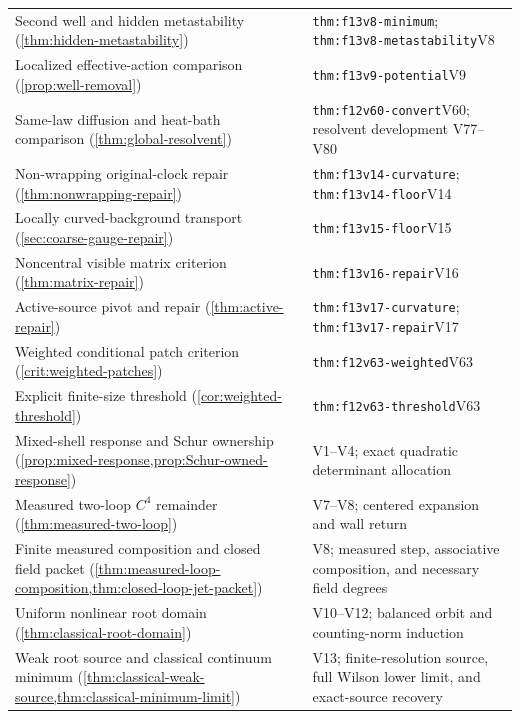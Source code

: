 \documentclass[11pt,oneside,openany]{book}
\theoremstyle{definition}
\theoremstyle{remark}
\begin{document}
\begin{longtable}{L{0.32\textwidth}L{0.12\textwidth}L{0.477\textwidth}}
Second well and hidden metastability (\cref{thm:hidden-metastability}) & \cite{F13} & \nolinkurl{thm:f13v8-minimum}; \nolinkurl{thm:f13v8-metastability}\newline V8 \\
Localized effective-action comparison (\cref{prop:well-removal}) & \cite{F13} & \nolinkurl{thm:f13v9-potential}\newline V9 \\
Same-law diffusion and heat-bath comparison (\cref{thm:global-resolvent}) & \cite{F12} & \nolinkurl{thm:f12v60-convert}\newline V60; resolvent development V77--V80 \\
Non-wrapping original-clock repair (\cref{thm:nonwrapping-repair}) & \cite{F13} & \nolinkurl{thm:f13v14-curvature}; \nolinkurl{thm:f13v14-floor}\newline V14 \\
Locally curved-background transport (\cref{sec:coarse-gauge-repair}) & \cite{F13} & \nolinkurl{thm:f13v15-floor}\newline V15 \\
Noncentral visible matrix criterion (\cref{thm:matrix-repair}) & \cite{F13} & \nolinkurl{thm:f13v16-repair}\newline V16 \\
Active-source pivot and repair (\cref{thm:active-repair}) & \cite{F13} & \nolinkurl{thm:f13v17-curvature}; \nolinkurl{thm:f13v17-repair}\newline V17 \\
Weighted conditional patch criterion (\cref{crit:weighted-patches}) & \cite{F12} & \nolinkurl{thm:f12v63-weighted}\newline V63 \\
Explicit finite-size threshold (\cref{cor:weighted-threshold}) & \cite{F12} & \nolinkurl{thm:f12v63-threshold}\newline V63 \\

Mixed-shell response and Schur ownership (\cref{prop:mixed-response,prop:Schur-owned-response}) & \cite{SM} & V1--V4; exact quadratic determinant allocation \\
Measured two-loop $C^4$ remainder (\cref{thm:measured-two-loop}) & \cite{SM} & V7--V8; centered expansion and wall return \\
Finite measured composition and closed field packet (\cref{thm:measured-loop-composition,thm:closed-loop-jet-packet}) & \cite{SM} & V8; measured step, associative composition, and necessary field degrees \\
Uniform nonlinear root domain (\cref{thm:classical-root-domain}) & \cite{SM} & V10--V12; balanced orbit and counting-norm induction \\
Weak root source and classical continuum minimum (\cref{thm:classical-weak-source,thm:classical-minimum-limit}) & \cite{SM} & V13; finite-resolution source, full Wilson lower limit, and exact-source recovery \\


\end{longtable}
\end{document}
